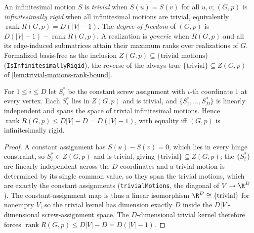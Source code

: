 \begin{definition}
  \label{def:dof-generic}
  An infinitesimal motion $S$ is \emph{trivial} when $S(u) = S(v)$ for
  all $u, v$; $(G,p)$ is \emph{infinitesimally rigid} when all
  infinitesimal motions are trivial, equivalently
  $\operatorname{rank} R(G,p) = D(|V|-1)$. The \emph{degree of freedom}
  of $(G,p)$ is $D(|V|-1) - \operatorname{rank} R(G,p)$. A realization is
  \emph{generic} when $R(G,p)$ and all its edge-induced submatrices
  attain their maximum ranks over realizations of $G$. Formalized
  basis-free as the inclusion $Z(G,p) \subseteq \{\text{trivial motions}\}$
  (\texttt{IsInfinitesimallyRigid}), the reverse of the always-true
  $\{\text{trivial}\} \subseteq Z(G,p)$ of
  \cref{lem:trivial-motions-rank-bound}.
\end{definition}

\begin{lemma}
  \label{lem:trivial-motions-rank-bound}
  \leanok
  For $1 \le i \le D$ let $S^*_i$ be the constant screw assignment with
  $i$-th coordinate $1$ at every vertex. Each $S^*_i$ lies in $Z(G,p)$
  and is trivial, and $\{S^*_1, \dots, S^*_D\}$ is linearly independent
  and spans the space of trivial infinitesimal motions. Hence
  $\operatorname{rank} R(G,p) \le D|V| - D = D(|V|-1)$, with equality iff
  $(G,p)$ is infinitesimally rigid.
\end{lemma}
\begin{proof}
  \leanok
  A constant assignment has $S(u) - S(v) = 0$, which lies in every
  hinge constraint, so $S^*_i \in Z(G,p)$ and is trivial, giving
  $\{\text{trivial}\} \subseteq Z(G,p)$; the
  $\{S^*_i\}$ are linearly independent across the $D$ coordinates and a
  trivial motion is determined by its single common value, so they span
  the trivial motions, which are exactly the constant assignments
  (\texttt{trivialMotions}, the diagonal of $V \to \R^{D}$). The
  constant-assignment map is thus a linear isomorphism
  $\R^{D} \cong \{\text{trivial}\}$ for nonempty $V$, so the trivial
  kernel has dimension exactly $D$ inside the $D|V|$-dimensional
  screw-assignment space. The $D$-dimensional trivial kernel therefore
  forces $\operatorname{rank} R(G,p) \le D|V| - D = D(|V|-1)$.
\end{proof}


